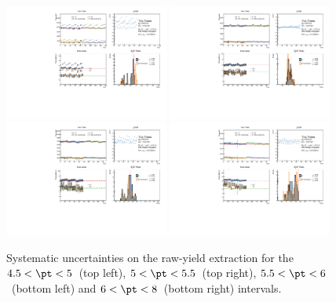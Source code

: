 \begin{figure}
    \centering
    \includegraphics[width=0.48\textwidth]{Figures/Chapter 5/AllPtBins/RawYieldSyst4.5_5.pdf}
    \includegraphics[width=0.48\textwidth]{Figures/Chapter 5/AllPtBins/RawYieldSyst5_5.5.pdf}
    \includegraphics[width=0.48\textwidth]{Figures/Chapter 5/AllPtBins/RawYieldSyst5.5_6.pdf}
    \includegraphics[width=0.48\textwidth]{Figures/Chapter 5/AllPtBins/RawYieldSyst6_8.pdf}
    \caption{Systematic uncertainties on the raw-yield extraction for the $4.5 < \pt < 5$~\gevc (top left), $5 < \pt < 5.5$~\gevc (top right), $5.5 < \pt < 6$~\gevc (bottom left) and $6 < \pt < 8$~\gevc (bottom right) intervals.}
\end{figure}

